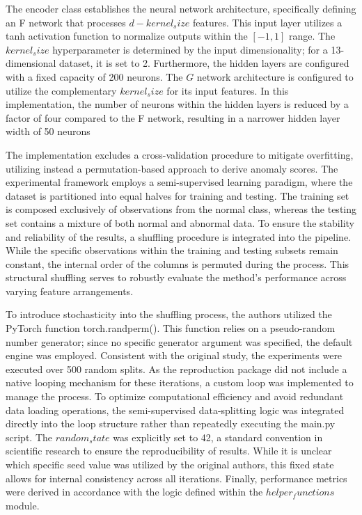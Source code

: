 The encoder class establishes the neural network architecture, specifically defining an F network that processes $d-kernel_size$ features. 
This input layer utilizes a tanh activation function to normalize outputs within the $[-1,1]$ range. 
The $kernel_size$ hyperparameter is determined by the input dimensionality; for a 13-dimensional dataset, it is set to 2. 
Furthermore, the hidden layers are configured with a fixed capacity of 200 neurons.
The $G$ network architecture is configured to utilize the complementary $kernel_size$ for its input features. 
In this implementation, the number of neurons within the hidden layers is reduced by a factor of four compared to the F network, resulting in a narrower hidden layer width of 50 neurons


The implementation excludes a cross-validation procedure to mitigate overfitting, utilizing instead a permutation-based approach to derive anomaly scores. 
The experimental framework employs a semi-supervised learning paradigm, where the dataset is partitioned into equal halves for training and testing. 
The training set is composed exclusively of observations from the normal class, whereas the testing set contains a mixture of both normal and abnormal data. 
To ensure the stability and reliability of the results, a shuffling procedure is integrated into the pipeline. 
While the specific observations within the training and testing subsets remain constant, the internal order of the columns is permuted during the process. 
This structural shuffling serves to robustly evaluate the method's performance across varying feature arrangements.


To introduce stochasticity into the shuffling process, the authors utilized the PyTorch function torch.randperm(). 
This function relies on a pseudo-random number generator; since no specific generator argument was specified, the default engine was employed. 
Consistent with the original study, the experiments were executed over 500 random splits. 
As the reproduction package did not include a native looping mechanism for these iterations, a custom loop was implemented to manage the process. 
To optimize computational efficiency and avoid redundant data loading operations, the semi-supervised data-splitting logic was integrated directly into the loop structure rather than repeatedly executing the main.py script. 
The $random_state$ was explicitly set to 42, a standard convention in scientific research to ensure the reproducibility of results. 
While it is unclear which specific seed value was utilized by the original authors, this fixed state allows for internal consistency across all iterations. 
Finally, performance metrics were derived in accordance with the logic defined within the $helper_functions$ module.


